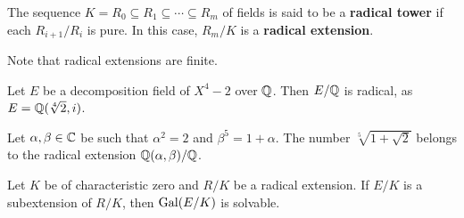 \begin{definition}
    The sequence $K=R_0\subseteq R_1\subseteq\cdots\subseteq R_m$ 
    of fields is said to be a \textbf{radical tower} if 
    each $R_{i+1}/R_i$ is pure. In this case, $R_m/K$ is a \textbf{radical extension}. 
\end{definition}

Note that radical extensions are finite. 

\begin{example}
    Let $E$ be a decomposition field of $X^4-2$ over $\mathbb{Q}$. Then $E/\mathbb{Q}$ is radical, 
    as $E=\mathbb{Q}(\sqrt[4]{2},i)$. 
\end{example}

\begin{example}
    Let $\alpha,\beta\in\mathbb{C}$ be such that $\alpha^2=2$ and 
    $\beta^5=1+\alpha$. 
    The number $\sqrt[5]{1+\sqrt{2}}$ belongs to the radical extension $\mathbb{Q}(\alpha,\beta)/\mathbb{Q}$. 
\end{example}

\begin{theorem}
\label{thm:by_radicals}
    Let $K$ be of characteristic zero and 
    $R/K$ be a radical extension. If $E/K$ is a subextension of $R/K$, 
    then $\operatorname{Gal}(E/K)$ is solvable. 
\end{theorem}

